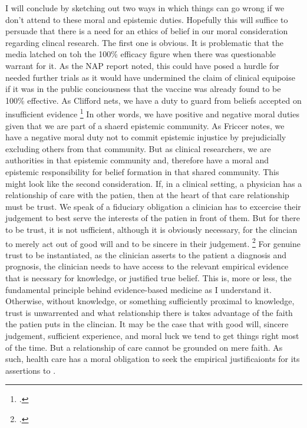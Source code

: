 \documentclass[letterpaper,notitlepage,12pt]{article}
\begin{document}
I will conclude by sketching out two ways in which things can go wrong if we
don't attend to these moral and epistemic duties.
Hopefully this will suffice to persuade that there is a need for an ethics of
belief in our moral consideration regarding clincal research.
The first one is obvious.
It is problematic that the media latched on toh the 100\% efficacy figure when
there was questionable warrant for it.
As the NAP report noted, this could have posed a hurdle for needed further
trials as it would have undermined the claim of clinical equipoise if it was in
the public conciousness that the vaccine was already found to be 100\%
effective.
As Clifford nets, we have a duty to guard from beliefs accepted on insufficient
evidence \footcite{344}
In other words, we have positive and negative moral duties given that we are
part of a shaerd epistemic community.
As Friccer notes, we have a negative moral duty not to commit epistemic
injustice by prejudicially excluding others from that community.
But as clinical researchers, we are authorities in that epistemic community and,
therefore have a moral and epistemic responsibility for belief formation in that
shared community.
This might look like the second consideration.
If, in a clinical setting, a physician has a relationship of care with the
patien, then at the heart of that care relationship must be trust.
We speak of a fiduciary obligation a clinician has to excercise their judgement
to best serve the interests of the patien in front of them.
But for there to be trust, it is not usfficient, although it is obviously
necessary, for the clincian to merely act out of good will and to be sincere in
their judgement.
\footcite{clifford
353}
For genuine trust to be instantiated, as the clinician asserts to the patient a
diagnosis and prognosis, the clinician needs to have access to the relevant
empirical evidence that is necssary for knowledge, or justified true belief.
This is, more or less, the fundamental principle behind evidence-based medicine
as I understand it.
Otherwise, without knowledge, or something sufficiently proximal to knowledge,
trust is unwarrented and what relationship there is takes advantage of the faith
the patien puts in the clincian.
It may be the case that with good will, sincere judgement, sufficient
experience, and moral luck we tend to get things right most of the time.
But a relationship of care cannot be grounded on mere faith.
As such, health care has a moral obligation to seek the empirical justificaionts
for its assertions to .
\end{document}
